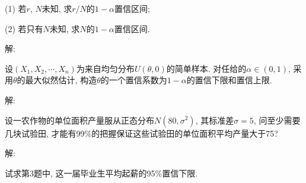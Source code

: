 \documentclass[standard]{ExBook}
\begin{document}
\begin{qitems}
\begin{bbox}
\begin{shaded}
(1) 若$r$, $N$未知, 求$r/N$的$1-\alpha$置信区间;

(2) 若只有$N$未知, 求$N$的$1 - \alpha$置信区间.
    \end{shaded}
    \end{bbox}

\vspace{-5em}

    \begin{bbox}
解: 
    \end{bbox}

\vspace{-5em}

    \begin{bbox}
    \begin{shaded}
        \qitem
设$(X_1,X_2,\cdots,X_n)$为来自均匀分布$U(\theta,0)$的简单样本. 对任给的$\alpha \in (0,1)$, 采用$\theta$的最大似然估计, 构造$\theta$的一个置信系数为$1-\alpha$的置信下限和置信上限.
    \end{shaded}
    \end{bbox}

\vspace{-5em}

    \begin{bbox}
解: 
    \end{bbox}

\vspace{-5em}

    \begin{bbox}
    \begin{shaded}
        \qitem
设一农作物的单位面积产量服从正态分布$N(80,\sigma^2)$, 其标准差$\sigma=5$, 问至少需要几块试验田, 才能有99\%的把握保证这些试验田的单位面积平均产量大于75?
    \end{shaded}
    \end{bbox}

\vspace{-5em}

    \begin{bbox}
解: 
    \end{bbox}

\vspace{-5em}

    \begin{bbox}
    \begin{shaded}
        \qitem
试求第3题中, 这一届毕业生平均起薪的95\%置信下限.
    \end{shaded}
    \end{bbox}

\vspace{-5em}


\end{qitems}
\end{document}
